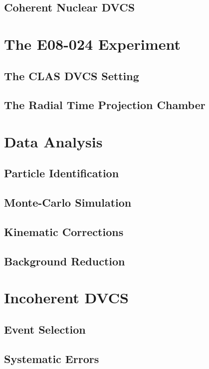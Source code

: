 \documentclass[aps,prc,preprint,superscriptaddress]{revtex4-1}
\begin{document}
  \subsection{Coherent Nuclear DVCS}

\section{The E08-024 Experiment}

  \subsection{The CLAS DVCS Setting}

  \subsection{The Radial Time Projection Chamber}

\section{Data Analysis}

  \subsection{Particle Identification}

  \subsection{Monte-Carlo Simulation}

  \subsection{Kinematic Corrections}

  \subsection{Background Reduction}

\section{Incoherent DVCS}

  \subsection{Event Selection}

  \subsection{Systematic Errors}
\end{document}
